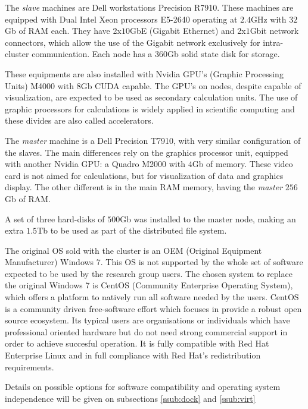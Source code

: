 \documentclass[twoside,a4paper,12pt,english]{inac17}
\begin{document}
The \textit{slave} machines are Dell workstations Precision R7910. These machines are equipped
with Dual Intel{\textregistered} Xeon{\textregistered} processors E5-2640 operating at $2.4$GHz with
$32$Gb of RAM each. They have 2x$10$GbE (Gigabit Ethernet) and 2x$1$Gbit network connectors, which
allow the use of the Gigabit network exclusively for intra-cluster communication. Each node
has a $360$Gb solid state disk for storage.

These equipments are also installed with Nvidia{\textregistered} GPU's (Graphic Processing Units) M4000{\textregistered} with $8$Gb CUDA\cite{CUDA} capable.
The GPU's on nodes, despite capable of visualization, are expected to be used as secondary calculation units.
The use of graphic processors for calculations is widely applied in scientific computing and these divides
are also called accelerators\cite{accelerators}.

The \textit{master} machine is a Dell Precision T7910, with very similar configuration of the slaves. The main
differences rely on the graphics processor unit, equipped with another Nvidia{\textregistered} GPU: a
Quadro{\textregistered} M2000 with $4$Gb of memory. These video card is not aimed for calculations, but for
visualization of data and graphics display. The other different is in the main RAM memory, having the \textit{master}
$256$Gb of RAM. 

A set of three hard-disks of $500$Gb was installed to the master node, making an extra $1.5$Tb to be used as part
of the distributed file system.

The original OS sold with the cluster is an OEM (Original Equipment Manufacturer) Windows 7{\textregistered}\cite{windows7}. This
OS is not supported by the whole set of software expected to be used by the research group users. The chosen
system to replace the original Windows 7 is CentOS (Community Enterprise Operating System)\cite{centos}, which offers a platform to natively run all
software needed by the users. CentOS is a community driven free-software effort which focuses in provide a robust open source ecosystem.
Its typical users are organisations or individuals which have professional oriented hardware but do not need strong commercial support
in order to achieve succesful operation. It is fully compatible with Red Hat Enterprise Linux and in full compliance with Red Hat's
redistribution requirements.

Details on possible options for software compatibility and operating system independence will be given on subsections \ref{ssub:dock} and \ref{ssub:virt}
\end{document}
